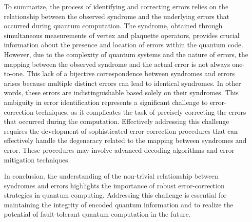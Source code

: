 \documentclass{Configuration_Files/PoliMi3i_thesis}
\begin{document}
To summarize, the process of identifying and correcting errors relies on the relationship between the observed syndrome and the underlying errors that occurred during quantum computation. 
The syndrome, obtained through simultaneous measurements of vertex and plaquette operators, provides crucial information about the presence and location of errors within the quantum code. However, due to the complexity of quantum systems and the nature of errors, the mapping between the observed syndrome and the actual error is not always one-to-one. 
This lack of a bijective correspondence between syndromes and errors arises because multiple distinct errors can lead to identical syndromes. In other words, these errors are indistinguishable based solely on their syndromes. 
This ambiguity in error identification represents a significant challenge to error-correction techniques, as it complicates the task of precisely correcting the errors that occurred during the computation. Effectively addressing this challenge requires the development of sophisticated error correction procedures that can effectively handle the degeneracy related to the mapping between syndromes and error. These procedures may involve advanced decoding algorithms and error mitigation techniques. \newline

In conclusion, the understanding of the non-trivial relationship between syndromes and errors highlights the importance of robust error-correction strategies in quantum computing. Addressing this challenge is essential for maintaining the integrity of encoded quantum information and to realize the potential of fault-tolerant quantum computation in the future. \newline

























\end{document}
